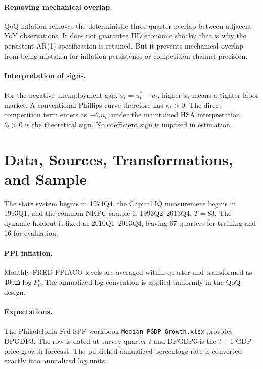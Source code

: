 \documentclass[11pt]{article}
\newcommand{\Nhat}{\hat n}
\newcommand{\code}[1]{\texttt{#1}}
\begin{document}
\paragraph{Removing mechanical overlap.}
QoQ inflation removes the deterministic three-quarter overlap between adjacent YoY
observations. It does not guarantee IID economic shocks; that is why the persistent AR(1)
specification is retained. But it prevents mechanical overlap from being mistaken for
inflation persistence or competition-channel precision.

\paragraph{Interpretation of signs.}
For the negative unemployment gap, $x_t=u_t^*-u_t$, higher $x_t$ means a tighter labor
market. A conventional Phillips curve therefore has $\kappa_t>0$. The direct competition
term enters as $-\theta_t\Nhat_t$; under the maintained HSA interpretation, $\theta_t>0$ is
the theoretical sign. No coefficient sign is imposed in estimation.

\section{Data, Sources, Transformations, and Sample}

The state system begins in 1974Q4, the Capital IQ measurement begins in 1993Q1, and the
common NKPC sample is 1993Q2--2013Q4, $T=83$. The dynamic holdout is fixed at
2010Q1--2013Q4, leaving 67 quarters for training and 16 for evaluation.

\begin{table}[H]
\centering
\caption{QoQ NKPC data summary}
\resizebox{\linewidth}{!}{}
\end{table}

\paragraph{PPI inflation.}
Monthly FRED PPIACO levels are averaged within quarter and transformed as
$400\Delta\log P_t$. The annualized-log convention is applied uniformly in the QoQ design.

\paragraph{Expectations.}
The Philadelphia Fed SPF workbook \code{Median\_PGDP\_Growth.xlsx} provides DPGDP3.
The row is dated at survey quarter $t$ and DPGDP3 is the $t+1$ GDP-price growth forecast.
The published annualized percentage rate is converted exactly into annualized log units.
\end{document}
